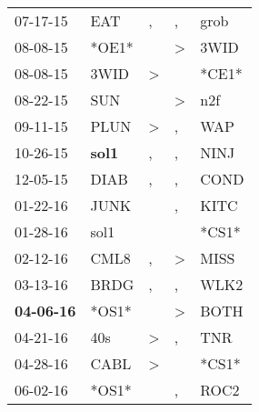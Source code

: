 \begin{supertabular}{p{0.07\textwidth}p{0.06\textwidth}p{0.02\textwidth}p{0.02\textwidth}p{0.06\textwidth}}
          07-17-15\textsuperscript{} &            EAT\textsuperscript{} &                , &             , &  grob\textsuperscript{} \\
          08-08-15\textsuperscript{} &                            *OE1* &                  &  \textgreater &  3WID\textsuperscript{} \\
          08-08-15\textsuperscript{} &           3WID\textsuperscript{} &     \textgreater &               &                   *CE1* \\
          08-22-15\textsuperscript{} &            SUN\textsuperscript{} &                  &  \textgreater &   n2f\textsuperscript{} \\
          09-11-15\textsuperscript{} &           PLUN\textsuperscript{} &     \textgreater &             , &   WAP\textsuperscript{} \\
          10-26-15\textsuperscript{} &  \textbf{sol1\textsuperscript{}} &                , &             , &  NINJ\textsuperscript{} \\
          12-05-15\textsuperscript{} &           DIAB\textsuperscript{} &                , &             , &  COND\textsuperscript{} \\
          01-22-16\textsuperscript{} &           JUNK\textsuperscript{} &                  &             , &  KITC\textsuperscript{} \\
          01-28-16\textsuperscript{} &           sol1\textsuperscript{} &                  &               &                   *CS1* \\
          02-12-16\textsuperscript{} &           CML8\textsuperscript{} &                , &  \textgreater &  MISS\textsuperscript{} \\
          03-13-16\textsuperscript{} &           BRDG\textsuperscript{} &                , &             , &  WLK2\textsuperscript{} \\
 \textbf{04-06-16\textsuperscript{}} &                            *OS1* &                  &  \textgreater &  BOTH\textsuperscript{} \\
          04-21-16\textsuperscript{} &            40s\textsuperscript{} &     \textgreater &             , &   TNR\textsuperscript{} \\
          04-28-16\textsuperscript{} &           CABL\textsuperscript{} &     \textgreater &               &                   *CS1* \\
          06-02-16\textsuperscript{} &                            *OS1* &                  &             , &  ROC2\textsuperscript{} \\

\end{supertabular}
